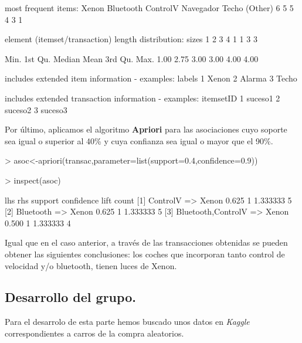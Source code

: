 \documentclass [a4paper] {article}
\begin{document}
{\begin{Schunk}
\begin{Soutput}
most frequent items:
    Xenon Bluetooth  ControlV Navegador     Techo   (Other) 
        6         5         5         4         3         1 

element (itemset/transaction) length distribution:
sizes
1 2 3 4 
1 1 3 3 

   Min. 1st Qu.  Median    Mean 3rd Qu.    Max. 
   1.00    2.75    3.00    3.00    4.00    4.00 

includes extended item information - examples:
  labels
1  Xenon
2 Alarma
3  Techo

includes extended transaction information - examples:
  itemsetID
1   suceso1
2   suceso2
3   suceso3
\end{Soutput}
\end{Schunk}

\bigskip
Por último, aplicamos el algoritmo \textbf{Apriori} para las asociaciones cuyo soporte sea igual o superior al 40\% y cuya confianza
sea igual o mayor que el 90\%.
\begin{Schunk}
\begin{Sinput}
> asoc<-apriori(transac,parameter=list(support=0.4,confidence=0.9))
\end{Sinput}
\end{Schunk}
\begin{Schunk}
\begin{Sinput}
> inspect(asoc)
\end{Sinput}
\begin{Soutput}
    lhs                     rhs     support confidence lift     count
[1] {ControlV}           => {Xenon} 0.625   1          1.333333 5    
[2] {Bluetooth}          => {Xenon} 0.625   1          1.333333 5    
[3] {Bluetooth,ControlV} => {Xenon} 0.500   1          1.333333 4    
\end{Soutput}
\end{Schunk}

\bigskip
Igual que en el caso anterior, a través de las transacciones obtenidas se pueden obtener las siguientes conclusiones: los 
coches que incorporan tanto control de velocidad y/o bluetooth, tienen luces de Xenon.


\bigskip
\subsection{Desarrollo del grupo.}
Para el desarrolo de esta parte hemos buscado unos datos en \textit{Kaggle} correspondientes a carros de la compra aleatorios.

}
\end{document}
